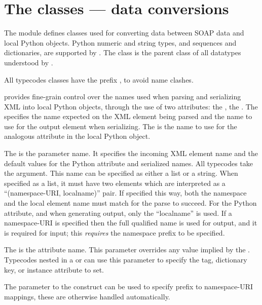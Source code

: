 \chapter{The  classes --- data conversions}

The  module defines classes used for converting data
between SOAP data and local Python objects.
Python numeric and string types, and sequences and dictionaries, are
supported by \ZSI{}.
The  class is the parent class of all datatypes
understood by \ZSI{}.

All typecodes classes have the prefix , to avoid name clashes.

\ZSI{} provides fine-grain control over the names used when parsing and
serializing XML into local Python objects, through the use of two
attributes: the , the .  The  specifies the
name expected on the XML element being parsed and the name to use for the output element
when serializing.  The  is the name to use for the analogous
attribute in the local Python object.

The  is the parameter name. It specifies the incoming
XML element name and the default values for the Python attribute
and serialized names.  All typecodes take the  argument.  This name can be
specified as either a list or a string.  When specified as a list, it must have
two elements which are interpreted as a ``(namespace-URI, localname)'' pair.
If specified this way, both the namespace and the local element name
must match for the parse to succeed.  For the Python attribute, and
when generating output, only the ``localname'' is used. If a namespace-URI is
specified then the full qualified name is used for output, and it is required
for input; this \emph{requires} the namespace prefix to be specified.

The  is the attribute name.  This parameter overrides
any value implied by the .  Typecodes nested in a 
or  can use this parameter to specify
the tag, dictionary key, or instance attribute to set.

The  parameter to the  construct can be used to
specify prefix to namespace-URI mappings, these are otherwise handled automatically.

\section{}

